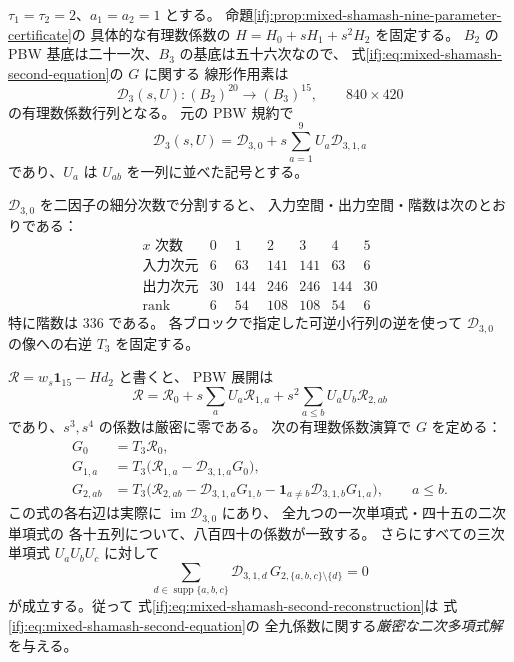 \begin{proposition}[標準係数における九変数全体の二次多項式証明書]
\label{ifj:prop:mixed-shamash-second-nine-certificate}
$\tau_1=\tau_2=2$、$a_1=a_2=1$ とする。
命題\ref{ifj:prop:mixed-shamash-nine-parameter-certificate}の
具体的な有理数係数の $H=H_0+sH_1+s^2H_2$ を固定する。
$B_2$ の PBW 基底は二十一次、$B_3$ の基底は五十六次なので、
式\eqref{ifj:eq:mixed-shamash-second-equation}の $G$ に関する
線形作用素は
\begin{equation}\label{ifj:eq:mixed-shamash-second-pbw-sizes}
 \mathcal D_3(s,U):(B_2)^{20}\to(B_3)^{15},
 \qquad840\times420
\end{equation}
の有理数係数行列となる。
元の PBW 規約で
\[
 \mathcal D_3(s,U)=\mathcal D_{3,0}
           +s\sum_{a=1}^9U_a\mathcal D_{3,1,a}
\]
であり、$U_a$ は $U_{ab}$ を一列に並べた記号とする。

$\mathcal D_{3,0}$ を二因子の細分次数で分割すると、
入力空間・出力空間・階数は次のとおりである：
\begin{equation}\label{ifj:eq:mixed-shamash-second-block-ranks}
 \begin{array}{c|rrrrrr}
  x\text{ 次数}&0&1&2&3&4&5\\\hline
  \text{入力次元}&6&63&141&141&63&6\\
  \text{出力次元}&30&144&246&246&144&30\\
  \operatorname{rank}&6&54&108&108&54&6
 \end{array}
\end{equation}
特に階数は $336$ である。
各ブロックで指定した可逆小行列の逆を使って
$\mathcal D_{3,0}$ の像への右逆 $T_3$ を固定する。

$\mathcal R=w_s\mathbf1_{15}-Hd_2$ と書くと、
PBW 展開は
\[
 \mathcal R=\mathcal R_0
  +s\sum_aU_a\mathcal R_{1,a}
  +s^2\sum_{a\le b}U_aU_b\mathcal R_{2,ab}
\]
であり、$s^3,s^4$ の係数は厳密に零である。
次の有理数係数演算で $G$ を定める：
\begin{equation}\label{ifj:eq:mixed-shamash-second-reconstruction}
 \begin{aligned}
 G_0&=T_3\mathcal R_0,\\
 G_{1,a}&=T_3\bigl(\mathcal R_{1,a}-\mathcal D_{3,1,a}G_0\bigr),\\
 G_{2,ab}&=T_3\bigl(\mathcal R_{2,ab}
   -\mathcal D_{3,1,a}G_{1,b}
   -\mathbf1_{a\ne b}\mathcal D_{3,1,b}G_{1,a}\bigr),
       \qquad a\le b.
 \end{aligned}
\end{equation}
この式の各右辺は実際に $\operatorname{im}\mathcal D_{3,0}$ にあり、
全九つの一次単項式・四十五の二次単項式の
各十五列について、八百四十の係数が一致する。
さらにすべての三次単項式 $U_aU_bU_c$ に対して
\begin{equation}\label{ifj:eq:mixed-shamash-second-cubic-zero}
 \boxed{\displaystyle
  \sum_{d\in\operatorname{supp}\{a,b,c\}}
     \mathcal D_{3,1,d}\,
       G_{2,\{a,b,c\}\setminus\{d\}}=0}
\end{equation}
が成立する。従って
式\eqref{ifj:eq:mixed-shamash-second-reconstruction}は
式\eqref{ifj:eq:mixed-shamash-second-equation}の
全九係数に関する\emph{厳密な二次多項式解}を与える。
\end{proposition}

